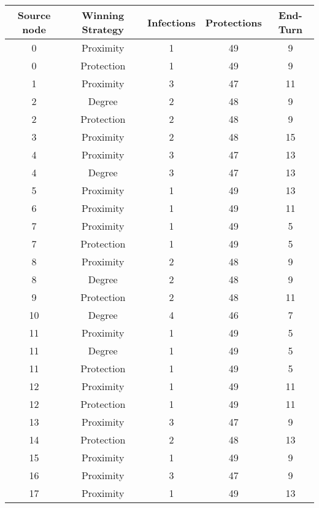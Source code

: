 \documentclass[results.tex]{subfiles}
\begin{document}
\begin{center}
  \begin{tabular}{| c || c | c | c | c |}
    \hline
    {\bfseries Source node} & {\bfseries Winning Strategy} & {\bfseries Infections} & {\bfseries Protections} & {\bfseries End-Turn} \\  %
    \hline\hline
    0 & Proximity & 1 & 49 & 9 \\ 
    \hline
    0 & Protection & 1 & 49 & 9 \\ 
    \hline
    1 & Proximity & 3 & 47 & 11 \\ 
    \hline
    2 & Degree & 2 & 48 & 9 \\ 
    \hline
    2 & Protection & 2 & 48 & 9 \\ 
    \hline
    3 & Proximity & 2 & 48 & 15 \\ 
    \hline
    4 & Proximity & 3 & 47 & 13 \\ 
    \hline
    4 & Degree & 3 & 47 & 13 \\ 
    \hline
    5 & Proximity & 1 & 49 & 13 \\ 
    \hline
    6 & Proximity & 1 & 49 & 11 \\ 
    \hline
    7 & Proximity & 1 & 49 & 5 \\ 
    \hline
    7 & Protection & 1 & 49 & 5 \\ 
    \hline
    8 & Proximity & 2 & 48 & 9 \\ 
    \hline
    8 & Degree & 2 & 48 & 9 \\ 
    \hline
    9 & Protection & 2 & 48 & 11 \\ 
    \hline
    10 & Degree & 4 & 46 & 7 \\ 
    \hline
    11 & Proximity & 1 & 49 & 5 \\ 
    \hline
    11 & Degree & 1 & 49 & 5 \\ 
    \hline
    11 & Protection & 1 & 49 & 5 \\ 
    \hline
    12 & Proximity & 1 & 49 & 11 \\ 
    \hline
    12 & Protection & 1 & 49 & 11 \\ 
    \hline
    13 & Proximity & 3 & 47 & 9 \\ 
    \hline
    14 & Protection & 2 & 48 & 13 \\ 
    \hline
    15 & Proximity & 1 & 49 & 9 \\ 
    \hline
    16 & Proximity & 3 & 47 & 9 \\ 
    \hline
    17 & Proximity & 1 & 49 & 13 \\ 
    \hline

\end{tabular}
\end{center}
\end{document}
